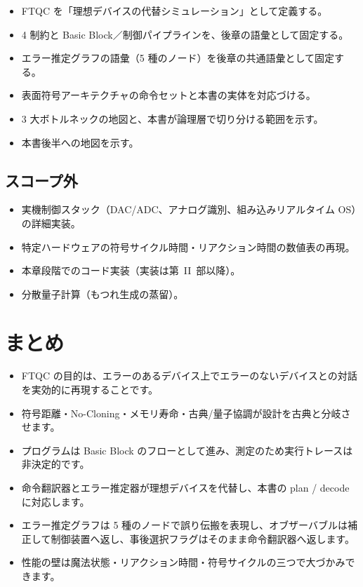 \begin{itemize}
  \item FTQC を「理想デバイスの代替シミュレーション」として定義する。
  \item 4 制約と Basic Block／制御パイプラインを、後章の語彙として固定する。
  \item エラー推定グラフの語彙（5 種のノード）を後章の共通語彙として固定する。
  \item 表面符号アーキテクチャの命令セットと本書の実体を対応づける。
  \item 3 大ボトルネックの地図と、本書が論理層で切り分ける範囲を示す。
  \item 本書後半への地図を示す。
\end{itemize}

\subsection{スコープ外}

\begin{itemize}
  \item 実機制御スタック（DAC/ADC、アナログ識別、組み込みリアルタイム OS）の詳細実装。
  \item 特定ハードウェアの符号サイクル時間・リアクション時間の数値表の再現。
  \item 本章段階でのコード実装（実装は第~II~部以降）。
  \item 分散量子計算（もつれ生成の蒸留）。
\end{itemize}

\section{まとめ}\label{sec:ftqc_summary}

\begin{itemize}
  \item FTQC の目的は、エラーのあるデバイス上でエラーのないデバイスとの対話を実効的に再現することです。
  \item 符号距離・No-Cloning・メモリ寿命・古典/量子協調が設計を古典と分岐させます。
  \item プログラムは Basic Block のフローとして進み、測定のため実行トレースは非決定的です。
  \item 命令翻訳器とエラー推定器が理想デバイスを代替し、本書の plan / decode に対応します。
  \item エラー推定グラフは 5 種のノードで誤り伝搬を表現し、オブザーバブルは補正して制御装置へ返し、事後選択フラグはそのまま命令翻訳器へ返します。
  \item 性能の壁は魔法状態・リアクション時間・符号サイクルの三つで大づかみできます。
\end{itemize}


